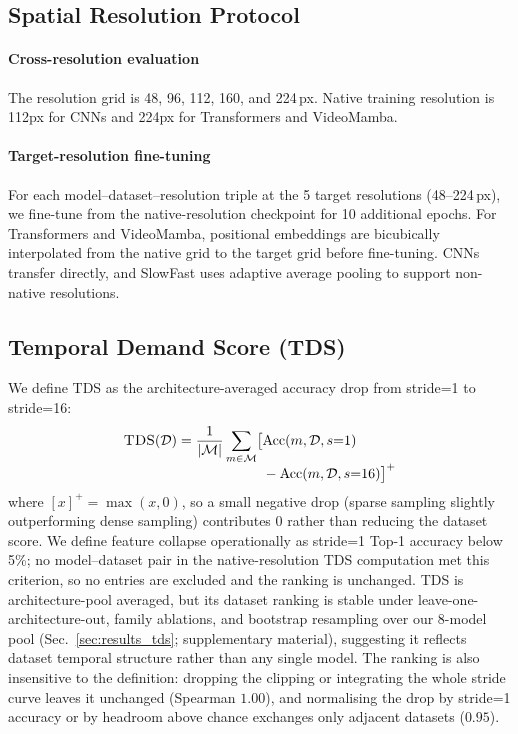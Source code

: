 \documentclass[a4paper, 10pt, conference]{ieeeconf}
\newcommand{\TDS}{\textsc{TDS}}
\begin{document}
\subsection{Spatial Resolution Protocol}

\paragraph{Cross-resolution evaluation}
The resolution grid is 48, 96, 112, 160, and 224\,px. Native training resolution is 112px for CNNs and 224px for Transformers and VideoMamba.

\paragraph{Target-resolution fine-tuning}
For each model--dataset--resolution triple at the 5 target resolutions (48--224\,px), we fine-tune from the native-resolution checkpoint for 10 additional epochs. For Transformers and VideoMamba, positional embeddings are bicubically interpolated from the native grid to the target grid before fine-tuning. CNNs transfer directly, and SlowFast uses adaptive average pooling to support non-native resolutions.

\subsection{Temporal Demand Score (\texorpdfstring{\TDS{}}{TDS})}

We define \TDS{} as the architecture-averaged accuracy drop from stride=1 to stride=16:
\begin{equation}
  \begin{split}
  \TDS(\mathcal{D}) = \frac{1}{|\mathcal{M}|} \sum_{m\in\mathcal{M}} \bigl[&\mathrm{Acc}(m,\mathcal{D},s{=}1)\\[-4pt]
  &- \mathrm{Acc}(m,\mathcal{D},s{=}16)\bigr]^+
  \end{split}
  \label{eq:tds}
\end{equation}
where $[x]^+=\max(x,0)$, so a small negative drop (sparse sampling slightly outperforming dense sampling) contributes 0 rather than reducing the dataset score. We define feature collapse operationally as stride=1 Top-1 accuracy below 5\%; no model--dataset pair in the native-resolution \TDS{} computation met this criterion, so no entries are excluded and the ranking is unchanged. \TDS{} is architecture-pool averaged, but its dataset ranking is stable under leave-one-architecture-out, family ablations, and bootstrap resampling over our 8-model pool (Sec.~\ref{sec:results_tds}; supplementary material), suggesting it reflects dataset temporal structure rather than any single model. The ranking is also insensitive to the definition: dropping the clipping or integrating the whole stride curve leaves it unchanged (Spearman $1.00$), and normalising the drop by stride=1 accuracy or by headroom above chance exchanges only adjacent datasets ($0.95$).
\end{document}
